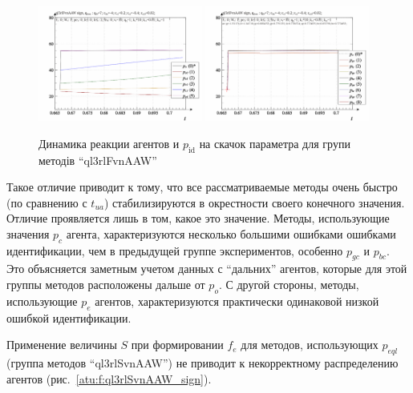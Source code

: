 \begin{figure}[htb!]
  \begin{center}
    \includegraphics[width=0.48\textwidth]{p/sign/qls-p_t_pi_m_ql3rlFvnAAW_sign.png}
    \hfill
    \includegraphics[width=0.48\textwidth]{p/sign/qls-p_t_p_m_ql3rlFvnAAW_sign.png}
  \end{center}
  \caption{Динамика реакции агентов и $p_\mathrm{id}$ на скачок параметра для групи методів ``ql3rlFvnAAW''}
  \label{atu:f:ql3rlFvnAAW_sign}
\end{figure}

Такое отличие приводит к тому, что все рассматриваемые методы
очень быстро (по сравнению с $t_{ua}$) стабилизируются
в окрестности своего конечного значения. Отличие проявляется лишь в том,
какое это значение. Методы, использующие значения $p_c$ агента,
характеризуются несколько большими ошибками ошибками идентификации,
чем в предыдущей группе экспериментов, особенно $p_{gc}$ и $p_{bc}$.
Это объясняется заметным учетом данных с ``дальних'' агентов,
которые для этой группы методов расположены дальше от $p_o$.
С другой стороны, методы, использующие $p_e$ агентов,
характеризуются практически одинаковой низкой ошибкой идентификации.


Применение величины $S$ при формировании $f_e$ для методов,
использующих $p_{eql}$ (группа методов ``ql3rlSvnAAW'') не приводит к
некорректному распределению агентов
(рис.~\ref{atu:f:ql3rlSvnAAW_sign}).


